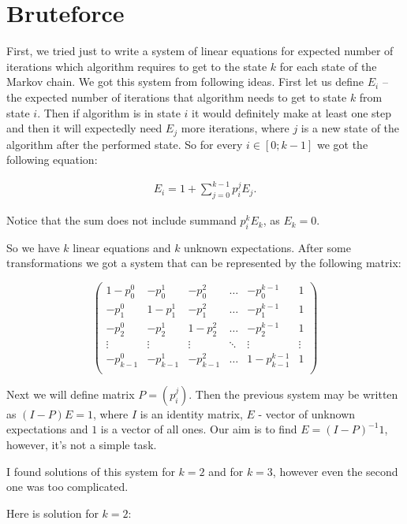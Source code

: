 \documentclass{article}
\begin{document}
\section{Bruteforce}

First, we tried just to write a system  of linear equations for expected number of iterations which algorithm requires to get to the state $k$ for each state of the Markov chain. We got this system from following ideas. First let us define $E_i$ -- the expected number of iterations that algorithm needs to get to state $k$ from state $i$. Then if algorithm is in state $i$ it would definitely make at least one step and then it will expectedly need $E_j$ more iterations, where $j$ is a new state of the algorithm after the performed state. So for every $i \in [0; k-1]$ we got the following equation:

\begin{align*}
 E_i = 1 + \sum\limits_{j = 0}^{k - 1} p_i^j E_j.
\end{align*}

Notice that the sum does not include summand $p_i^k E_k$, as $E_k = 0$.

So we have $k$ linear equations and $k$ unknown expectations. After some transformations we got a system that can be represented by the following matrix:

$$
 \left(
  \begin{array}{ccccc|c}
   1 - p_0^0 & -p_0^1 & -p_0^2 & \dots & -p_0^{k - 1} & 1 \\
   -p_1^0 & 1 - p_1^1 & -p_1^2 & \dots & -p_1^{k - 1} & 1 \\
   -p_2^0 & -p_2^1 & 1 - p_2^2 & \dots & -p_2^{k - 1} & 1 \\
   \vdots & \vdots & \vdots & \ddots & \vdots & \vdots \\
   -p_{k - 1}^0 & -p_{k - 1}^1 & -p_{k - 1}^2 & \dots & 1 - p_{k - 1}^{k - 1} & 1 \\
  \end{array}
 \right)
$$

Next we will define matrix $P = (p_i^j)$. Then the previous system may be written as $(I - P)E = 1$, where $I$ is an identity matrix, $E$ - vector of unknown expectations and $1$ is a vector of all ones. Our aim is to find $E = (I - P)^{-1} 1$, however, it's not a simple task.

I found solutions of this system for $k = 2$ and for $k = 3$, however even the second one was too complicated. 

Here is solution for $k = 2$:
\end{document}
